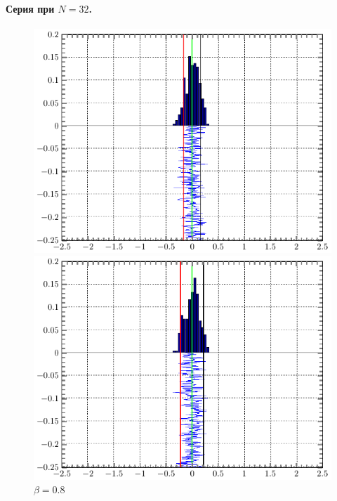 \documentclass[a4paper,14pt]{extarticle}
\begin{document}
\paragraph{Серия при $N=32$.} \hphantom{asasfsd}
\begin{figure}[H]
\begin{minipage}{0.3\linewidth}
    \centering
    \includegraphics[width=\linewidth]{fig/gist_n32_b80.pdf}
    \vspace{-1em}
    \caption{$\beta =0.8$}
\end{minipage}
\begin{minipage}{0.3\linewidth}
    \centering
    \includegraphics[width=\linewidth]{fig/gist_n32_b95.pdf}
    \vspace{-1em}

\end{minipage}
\end{figure}
\end{document}
